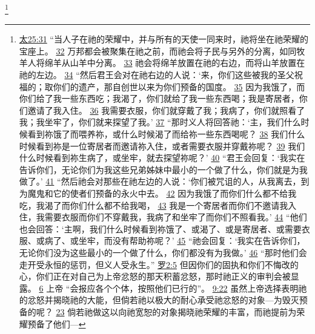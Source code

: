 \documentclass[12pt, a4paper, oneside]{ctexart}
\begin{document}
	\footnote {
		\href{https://biblehub.com/matthew/25-31.htm}{太25:31} “当人子在祂的荣耀中，并与所有的天使一同来时，祂将坐在祂荣耀的宝座上。
		\href{https://biblehub.com/matthew/25-32.htm}{32} 万邦都会被聚集在祂之前，而祂会将子民与另外的分离，如同牧羊人将绵羊从山羊中分离。
		\href{https://biblehub.com/matthew/25-33.htm}{33} 祂会将绵羊放置在祂的右边，而将山羊放置在祂的左边。
		\href{https://biblehub.com/matthew/25-34.htm}{34} “然后君王会对在祂右边的人说：‘来，你们这些被我的圣父祝福的；取你们的遗产，那自创世以来为你们预备的国度。
		\href{https://biblehub.com/matthew/25-35.htm}{35} 因为我饿了，而你们给了我一些东西吃；我渴了，你们就给了我一些东西喝；我是寄居者，你们邀请了我入住。
		\href{https://biblehub.com/matthew/25-36.htm}{36} 我需要衣服，你们就穿戴了我；我病了，你们就照看了我；我坐牢了，你们就来探望了我。’
		\href{https://biblehub.com/matthew/25-37.htm}{37} “那时义人将回答祂：‘主，我们什么时候看到祢饿了而喂养祢，或什么时候渴了而给祢一些东西喝呢？
		\href{https://biblehub.com/matthew/25-38.htm}{38} 我们什么时候看到祢是一位寄居者而邀请祢入住，或者需要衣服并穿戴祢呢？
		\href{https://biblehub.com/matthew/25-39.htm}{39} 我们什么时候看到祢生病了，或坐牢，就去探望祢呢？’
		\href{https://biblehub.com/matthew/25-40.htm}{40} “君王会回复：‘我实在告诉你们，无论你们为我这些兄弟姊妹中最小的一个做了什么，你们就是为我做了。’
		\href{https://biblehub.com/matthew/25-41.htm}{41} “然后祂会对那些在祂左边的人说：‘你们被咒诅的人，从我离去，到为魔鬼和它的使者们预备的永火中去。
		\href{https://biblehub.com/matthew/25-42.htm}{42} 因为我饿了而你们什么都不给我吃，我渴了而你们什么都不给我喝，
		\href{https://biblehub.com/matthew/25-43.htm}{43} 我是一个寄居者而你们不邀请我入住，我需要衣服而你们不穿戴我，我病了和坐牢了而你们不照看我。’
		\href{https://biblehub.com/matthew/25-44.htm}{44} “他们也会回答：‘主啊，我们什么时候看到祢饿了、或渴了、或是寄居者、或需要衣服、或病了、或坐牢，而没有帮助祢呢？’
		\href{https://biblehub.com/matthew/25-45.htm}{45} “祂会回复：‘我实在告诉你们，无论你们没为这些最小的一个做了什么，你们都没有为我做。’
		\href{https://biblehub.com/matthew/25-46.htm}{46} “那时他们会走开受永恒的惩罚，但义人受永生。”
		\href{https://biblehub.com/romans/2-5.htm}{罗2:5} 但因你们的固执和你们不悔改的心，你们正在对自己为上帝忿怒的那天积蓄忿怒，那时祂正义的审判会被显露。
		\href{https://biblehub.com/romans/2-6.htm}{6} 上帝 “会报应各个个体，按照他们已行的”。
		\href{https://biblehub.com/romans/9-22.htm}{9:22} 虽然上帝选择表明祂的忿怒并揭晓祂的大能，但倘若祂以极大的耐心承受祂忿怒的对象---为毁灭预备的呢？
		\href{https://biblehub.com/romans/9-23.htm}{23} 倘若祂做这以向祂宽恕的对象揭晓祂荣耀的丰富，而祂提前为荣耀预备了他们---
}
\end{document}
